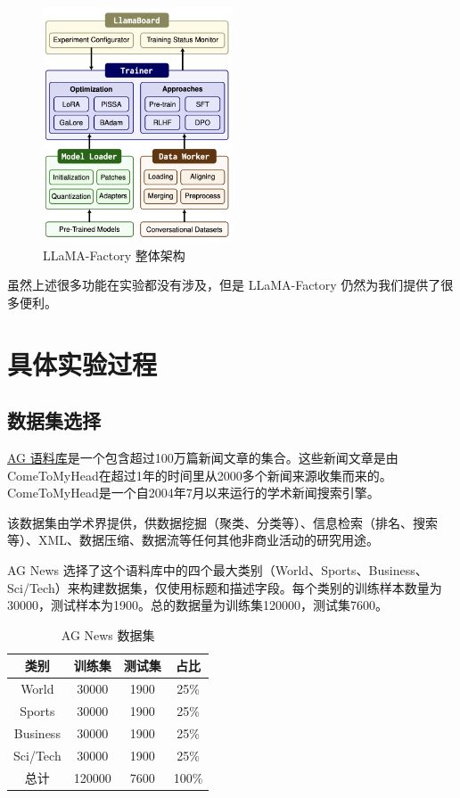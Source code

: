 \begin{figure}[htbp]
    \centering
    \includegraphics[width=0.5\textwidth]{images/factory.png}
    \caption{LLaMA-Factory 整体架构}
\end{figure}

虽然上述很多功能在实验都没有涉及，但是 LLaMA-Factory 仍然为我们提供了很多便利。

\section{具体实验过程}

\subsection{数据集选择}

\href{http://groups.di.unipi.it/~gulli/AG_corpus_of_news_articles.html}{AG 语料库}是一个包含超过100万篇新闻文章的集合。这些新闻文章是由ComeToMyHead在超过1年的时间里从2000多个新闻来源收集而来的。ComeToMyHead是一个自2004年7月以来运行的学术新闻搜索引擎。

该数据集由学术界提供，供数据挖掘（聚类、分类等）、信息检索（排名、搜索等）、XML、数据压缩、数据流等任何其他非商业活动的研究用途。

AG News 选择了这个语料库中的四个最大类别（World、Sports、Business、Sci/Tech）来构建数据集，仅使用标题和描述字段。每个类别的训练样本数量为30000，测试样本为1900。总的数据量为训练集120000，测试集7600。

\begin{table}[htbp]
    \centering
    \begin{tabular}{cccc}
        \toprule
        \textbf{类别} & \textbf{训练集} & \textbf{测试集} & \textbf{占比} \\
        \midrule
        World & 30000 & 1900 & 25\% \\
        Sports & 30000 & 1900 & 25\%  \\
        Business & 30000 & 1900 & 25\% \\
        Sci/Tech & 30000 & 1900 & 25\%  \\
        \midrule
        总计 & 120000 & 7600 & 100\%  \\
        \bottomrule
    \end{tabular}
    \caption{AG News 数据集}
\end{table}

